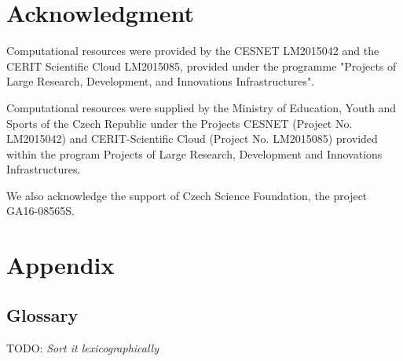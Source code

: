 \documentclass[
  print, %
  Table,   %
  nolof,     %
  nolot,     %
  11pt, %
  oneside  %
]{fithesis3}
\newcommand{\todo}[1]{TODO: \textit{#1}}
\begin{document}

\chapter*{Acknowledgment}
\label{chap:ack}

Computational resources were provided by the CESNET LM2015042 and the CERIT Scientific Cloud LM2015085, provided under the programme "Projects of Large Research, Development, and Innovations Infrastructures".

Computational resources were supplied by the Ministry of Education, Youth and Sports of the Czech Republic under the Projects CESNET (Project No. LM2015042) and CERIT-Scientific Cloud (Project No. LM2015085) provided within the program Projects of Large Research, Development and Innovations Infrastructures.

We also acknowledge the support of Czech Science Foundation, the project GA16-08565S.


\printbibliography[heading=bibintoc] %

\chapter*{Appendix}
\label{chap:app}

\section{Glossary}
\label{sec:app-glos}

\todo{Sort it lexicographically}
\end{document}
